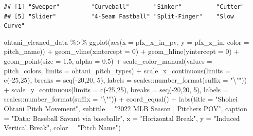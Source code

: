 \documentclass[
  11pt,
]{book}
\newenvironment{Shaded}{\begin{snugshade}}{\end{snugshade}}
\newcommand{\AttributeTok}[1]{\textcolor[rgb]{0.77,0.63,0.00}{#1}}
\newcommand{\DecValTok}[1]{\textcolor[rgb]{0.00,0.00,0.81}{#1}}
\newcommand{\FloatTok}[1]{\textcolor[rgb]{0.00,0.00,0.81}{#1}}
\newcommand{\FunctionTok}[1]{\textcolor[rgb]{0.00,0.00,0.00}{#1}}
\newcommand{\NormalTok}[1]{#1}
\newcommand{\SpecialCharTok}[1]{\textcolor[rgb]{0.00,0.00,0.00}{#1}}
\newcommand{\StringTok}[1]{\textcolor[rgb]{0.31,0.60,0.02}{#1}}
\theoremstyle{definition}
\theoremstyle{definition}
\theoremstyle{definition}
\theoremstyle{definition}
\theoremstyle{remark}
\begin{document}
\begin{verbatim}
## [1] "Sweeper"         "Curveball"       "Sinker"          "Cutter"         
## [5] "Slider"          "4-Seam Fastball" "Split-Finger"    "Slow Curve"
\end{verbatim}

\newpage

\begin{Shaded}
\begin{Highlighting}[]
\NormalTok{ohtani\_cleaned\_data }\SpecialCharTok{\%\textgreater{}\%} 
  \FunctionTok{ggplot}\NormalTok{(}\FunctionTok{aes}\NormalTok{(}\AttributeTok{x =}\NormalTok{ pfx\_x\_in\_pv, }\AttributeTok{y =}\NormalTok{ pfx\_z\_in, }\AttributeTok{color =}\NormalTok{ pitch\_name)) }\SpecialCharTok{+}
  \FunctionTok{geom\_vline}\NormalTok{(}\AttributeTok{xintercept =} \DecValTok{0}\NormalTok{) }\SpecialCharTok{+}
  \FunctionTok{geom\_hline}\NormalTok{(}\AttributeTok{yintercept =} \DecValTok{0}\NormalTok{) }\SpecialCharTok{+}
  \FunctionTok{geom\_point}\NormalTok{(}\AttributeTok{size =} \FloatTok{1.5}\NormalTok{, }\AttributeTok{alpha =} \FloatTok{0.5}\NormalTok{) }\SpecialCharTok{+}
  \FunctionTok{scale\_color\_manual}\NormalTok{(}\AttributeTok{values =}\NormalTok{ pitch\_colors,}
                     \AttributeTok{limits =}\NormalTok{ ohtani\_pitch\_types) }\SpecialCharTok{+}
  \FunctionTok{scale\_x\_continuous}\NormalTok{(}\AttributeTok{limits =} \FunctionTok{c}\NormalTok{(}\SpecialCharTok{{-}}\DecValTok{25}\NormalTok{,}\DecValTok{25}\NormalTok{),}
                     \AttributeTok{breaks =} \FunctionTok{seq}\NormalTok{(}\SpecialCharTok{{-}}\DecValTok{20}\NormalTok{,}\DecValTok{20}\NormalTok{, }\DecValTok{5}\NormalTok{),}
                     \AttributeTok{labels =}\NormalTok{ scales}\SpecialCharTok{::}\FunctionTok{number\_format}\NormalTok{(}\AttributeTok{suffix =} \StringTok{"}\SpecialCharTok{\textbackslash{}"}\StringTok{"}\NormalTok{)) }\SpecialCharTok{+}
  \FunctionTok{scale\_y\_continuous}\NormalTok{(}\AttributeTok{limits =} \FunctionTok{c}\NormalTok{(}\SpecialCharTok{{-}}\DecValTok{25}\NormalTok{,}\DecValTok{25}\NormalTok{),}
                     \AttributeTok{breaks =} \FunctionTok{seq}\NormalTok{(}\SpecialCharTok{{-}}\DecValTok{20}\NormalTok{,}\DecValTok{20}\NormalTok{, }\DecValTok{5}\NormalTok{),}
                     \AttributeTok{labels =}\NormalTok{ scales}\SpecialCharTok{::}\FunctionTok{number\_format}\NormalTok{(}\AttributeTok{suffix =} \StringTok{"}\SpecialCharTok{\textbackslash{}"}\StringTok{"}\NormalTok{)) }\SpecialCharTok{+}
  \FunctionTok{coord\_equal}\NormalTok{() }\SpecialCharTok{+}
  \FunctionTok{labs}\NormalTok{(}\AttributeTok{title =} \StringTok{"Shohei Ohtani Pitch Movement"}\NormalTok{,}
       \AttributeTok{subtitle =} \StringTok{"2022 MLB Season | Pitcher\textquotesingle{}s POV"}\NormalTok{,}
       \AttributeTok{caption =} \StringTok{"Data: Baseball Savant via baseballr"}\NormalTok{, }
       \AttributeTok{x =} \StringTok{"Horizontal Break"}\NormalTok{,}
       \AttributeTok{y =} \StringTok{"Induced Vertical Break"}\NormalTok{,}
       \AttributeTok{color =} \StringTok{"Pitch Name"}\NormalTok{)}
\end{Highlighting}
\end{Shaded}
\end{document}
